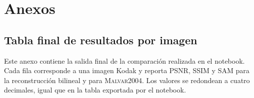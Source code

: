 \documentclass[11pt,a4paper]{article}
\newcommand{\malvar}{\textsc{Malvar2004}}
\begin{document}
\clearpage
\renewcommand{\refname}{Referencias}


\newpage

\appendix
\section{Anexos}
\label{app:anexos}

\subsection{Tabla final de resultados por imagen}
\label{app:tabla-final}

Este anexo contiene la salida final de la comparación realizada en el notebook. Cada fila corresponde a una imagen Kodak y reporta PSNR, SSIM y SAM para la reconstrucción bilineal y para \malvar{}. Los valores se redondean a cuatro decimales, igual que en la tabla exportada por el notebook.
\end{document}
